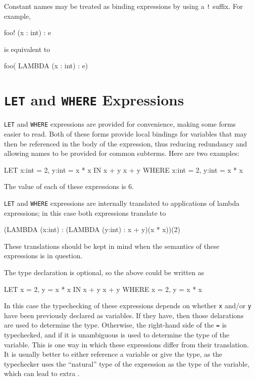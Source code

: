 Constant names may be treated as binding expressions by using a
\texttt{!}  suffix.  For example,
\begin{pvsex}
foo! (x : int) : e
\end{pvsex}
is equivalent to
\begin{pvsex}
foo( LAMBDA (x : int) : e)
\end{pvsex}

\section{\texttt{LET} and \texttt{WHERE} Expressions}

\texttt{LET} and \texttt{WHERE} expressions are provided for convenience,
making some forms easier to read.  Both of these forms provide local
bindings for variables that may then be referenced in the body of the
expression, thus reducing redundancy and allowing names to be provided for common subterms.
Here are two examples:
\begin{pvsex}
  LET x:int = 2, y:int = x * x IN x + y
  x + y WHERE x:int = 2, y:int = x * x
\end{pvsex}
%
The value of each of these expressions is 6.

\texttt{LET} and \texttt{WHERE} expressions are internally translated to
applications of lambda expressions; in this case both expressions
translate to
\begin{pvsex}
  (LAMBDA (x:int) : (LAMBDA (y:int) : x + y)(x * x))(2)
\end{pvsex}
%
These translations should be kept in mind when the semantics of these
expressions is in question.

The type declaration is optional, so the above could be written as
\begin{pvsex}
  LET x = 2, y = x * x IN x + y
  x + y WHERE x = 2, y = x * x
\end{pvsex}
In this case the typechecking of these expressions depends on whether
\texttt{x} and/or \texttt{y} have been previously declared as variables.
If they have, then those delarations are used to determine the type.
Otherwise, the right-hand side of the \texttt{=} is typechecked, and if it
is unambiguous is used to determine the type of the variable.  This is 
one way in which these expressions differ from their translation.
It is usually better to either reference a variable or give the type, as
the typechecker uses the ``natural'' type of the expression as the type of
the variable, which can lead to extra \tccs.

